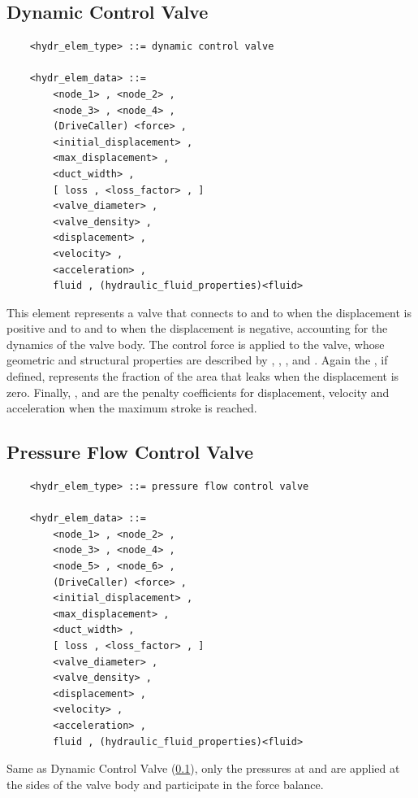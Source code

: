 \subsection{Dynamic Control Valve}
\label{sec:EL:HYDR:DYNAMIC_CONTROL_VALVE}
\begin{verbatim}
    <hydr_elem_type> ::= dynamic control valve

    <hydr_elem_data> ::=
        <node_1> , <node_2> ,
        <node_3> , <node_4> ,
        (DriveCaller) <force> ,
        <initial_displacement> ,
        <max_displacement> ,
        <duct_width> ,
        [ loss , <loss_factor> , ]
        <valve_diameter> ,
        <valve_density> ,
        <displacement> ,
        <velocity> ,
        <acceleration> ,
        fluid , (hydraulic_fluid_properties)<fluid>
\end{verbatim}
This element represents a valve that connects
 to  and  to 
when the displacement is positive and  to 
and  to  when the displacement is negative,
accounting for the dynamics of the valve body.
The control force  is applied to the valve, whose 
geometric and structural properties are described by 
, ,
,  and .
Again the , if defined, represents the fraction
of the area that leaks when the displacement is zero.
Finally, ,  and 
are the penalty coefficients for displacement, velocity and acceleration
when the maximum stroke is reached.




\subsection{Pressure Flow Control Valve}
\label{sec:EL:HYDR:PRESSURE_FLOW_CONTROL_VALVE}
\begin{verbatim}
    <hydr_elem_type> ::= pressure flow control valve

    <hydr_elem_data> ::=
        <node_1> , <node_2> ,
        <node_3> , <node_4> ,
        <node_5> , <node_6> ,
        (DriveCaller) <force> ,
        <initial_displacement> ,
        <max_displacement> ,
        <duct_width> ,
        [ loss , <loss_factor> , ]
        <valve_diameter> ,
        <valve_density> ,
        <displacement> ,
        <velocity> ,
        <acceleration> ,
        fluid , (hydraulic_fluid_properties)<fluid>
\end{verbatim}
Same as Dynamic Control Valve (\ref{sec:EL:HYDR:DYNAMIC_CONTROL_VALVE}),
only the pressures at  and  are applied
at the sides of the valve body and participate in the force balance.



